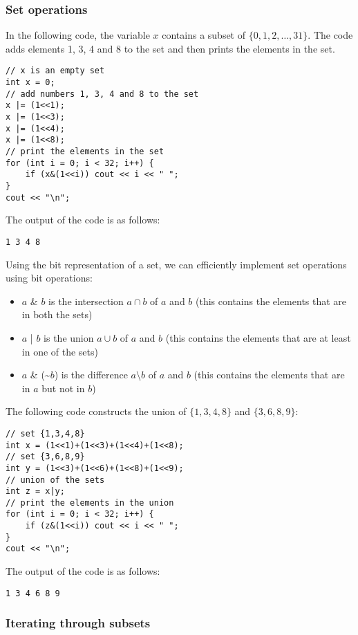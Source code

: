 \subsubsection{Set operations}

In the following code, the variable $x$
contains a subset of $\{0,1,2,\ldots,31\}$.
The code adds elements 1, 3, 4 and 8
to the set and then prints the elements in the set.

\begin{lstlisting}
// x is an empty set
int x = 0;
// add numbers 1, 3, 4 and 8 to the set
x |= (1<<1);
x |= (1<<3);
x |= (1<<4);
x |= (1<<8);
// print the elements in the set
for (int i = 0; i < 32; i++) {
    if (x&(1<<i)) cout << i << " ";
}
cout << "\n";
\end{lstlisting}

The output of the code is as follows:
\begin{lstlisting}
1 3 4 8
\end{lstlisting}

Using the bit representation of a set,
we can efficiently implement set operations
using bit operations:
\begin{itemize}
\item $a$ \& $b$ is the intersection $a \cap b$ of $a$ and $b$
(this contains the elements that are in both the sets)
\item $a$ | $b$ is the union $a \cup b$ of $a$ and $b$
(this contains the elements that are at least
in one of the sets)
\item $a$ \& (\textasciitilde$b$) is the difference
$a \setminus b$ of $a$ and $b$
(this contains the elements that are in $a$
but not in $b$)
\end{itemize}

The following code constructs the union
of $\{1,3,4,8\}$ and $\{3,6,8,9\}$:

\begin{lstlisting}
// set {1,3,4,8}
int x = (1<<1)+(1<<3)+(1<<4)+(1<<8);
// set {3,6,8,9}
int y = (1<<3)+(1<<6)+(1<<8)+(1<<9);
// union of the sets
int z = x|y;
// print the elements in the union
for (int i = 0; i < 32; i++) {
    if (z&(1<<i)) cout << i << " ";
}
cout << "\n";
\end{lstlisting}

The output of the code is as follows:
\begin{lstlisting}
1 3 4 6 8 9
\end{lstlisting}

\subsubsection{Iterating through subsets}

